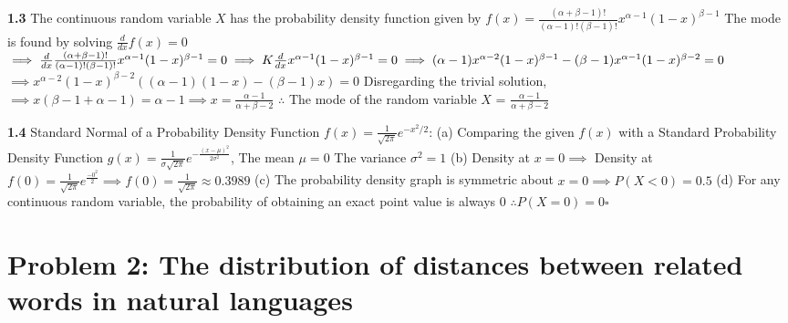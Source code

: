 \documentclass[11pt, letterpaper]{article}
\newenvironment{problem}[2][Problem]
    {\section*{#1 #2}}
    {}
\begin{document}
\textbf{1.3} The continuous random variable $X$ has the probability density function given by $f(x) = \frac{(\alpha + \beta - 1)!}{(\alpha - 1)!(\beta - 1)!}x^{\alpha - 1}(1-x)^{\beta - 1}$ \newline \newline 
The mode is found by solving $\frac{d}{dx}f(x) = 0$ \newline
$\implies \frac{d}{dx}\frac{(\alpha + \beta - 1)!}{(\alpha - 1)!(\beta - 1)!}x^{\alpha - 1}(1-x)^{\beta - 1} = 0 \implies K\frac{d}{dx}x^{\alpha - 1}(1-x)^{\beta - 1} = 0 \newline \implies (\alpha - 1)x^{\alpha - 2}(1-x)^{\beta - 1} - (\beta - 1)x^{\alpha - 1}(1-x)^{\beta - 2} = 0$\newline $\implies x^{\alpha - 2}(1-x)^{\beta -2}((\alpha - 1)(1-x) - (\beta - 1)x) = 0$ \newline Disregarding the trivial solution, \newline $\implies x(\beta - 1 + \alpha -1) = \alpha -1 \implies x = \frac{\alpha -1}{\alpha + \beta - 2}$ \newline
$\therefore$ The mode of the random variable $X$ = $\frac{\alpha -1}{\alpha + \beta - 2}$
\newline 

\textbf{1.4} Standard Normal of a Probability Density Function $f(x) = \frac{1}{\sqrt{2\pi}}e^{-x^2/2}$: \newline
\newline
(a) Comparing the given $f(x)$ with a Standard Probability Density Function $g(x) = \frac{1}{\sigma\sqrt{2\pi}} e^{-\frac{(x-\mu)^2}{2\sigma^2}}$, \newline The mean $\mu = 0$ \newline The variance $\sigma^2 = 1$ \newline
(b) Density at $x = 0 \implies$ Density at $f(0) = \frac{1}{\sqrt{2\pi}}e^\frac{-0^2}{2} \implies f(0) = \frac{1}{\sqrt{2\pi}} \approx 0.3989$ \newline
(c) The probability density graph is symmetric about $x = 0 \implies P(X < 0) = 0.5$ \newline
(d) For any continuous random variable, the probability of obtaining an exact point value is always 0 $\therefore P(X = 0) = 0 \square$
\newline
\vspace{3pt}

\begin{problem}{2: The distribution of distances between related words in natural languages}
\end{problem}
\end{document}
